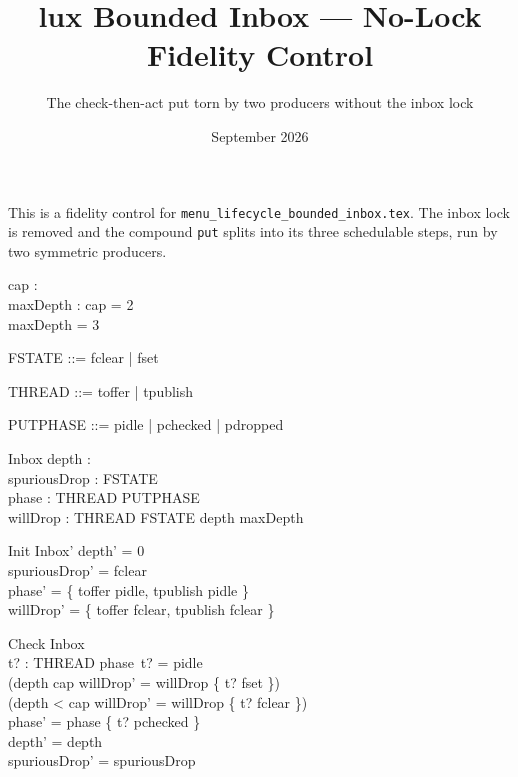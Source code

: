 \documentclass[a4paper,10pt,fleqn]{article}
\begin{document}
\title{lux Bounded Inbox --- No-Lock Fidelity Control}
\author{The check-then-act put torn by two producers without the inbox lock}
\date{September 2026}
\maketitle

This is a fidelity control for \texttt{menu\_lifecycle\_bounded\_inbox.tex}. The
inbox lock is removed and the compound \texttt{put} splits into its three
schedulable steps, run by two symmetric producers.

\begin{axdef}
  cap : \nat \\
  maxDepth : \nat
\where
  cap = 2 \\
  maxDepth = 3
\end{axdef}

\begin{zed}
  FSTATE ::= fclear | fset
\end{zed}

\begin{zed}
  THREAD ::= toffer | tpublish
\end{zed}

\begin{zed}
  PUTPHASE ::= pidle | pchecked | pdropped
\end{zed}

\begin{schema}{Inbox}
  depth : \nat \\
  spuriousDrop : FSTATE \\
  phase : THREAD \fun PUTPHASE \\
  willDrop : THREAD \fun FSTATE
\where
  depth \leq maxDepth
\end{schema}

\begin{schema}{Init}
  Inbox'
\where
  depth' = 0 \\
  spuriousDrop' = fclear \\
  phase' = \{ toffer \mapsto pidle, tpublish \mapsto pidle \} \\
  willDrop' = \{ toffer \mapsto fclear, tpublish \mapsto fclear \}
\end{schema}

\begin{schema}{Check}
  \Delta Inbox \\
  t? : THREAD
\where
  phase~t? = pidle \\
  (depth \geq cap \implies willDrop' = willDrop \oplus \{ t? \mapsto fset \}) \\
  (depth < cap \implies willDrop' = willDrop \oplus \{ t? \mapsto fclear \}) \\
  phase' = phase \oplus \{ t? \mapsto pchecked \} \\
  depth' = depth \\
  spuriousDrop' = spuriousDrop
\end{schema}
\end{document}
